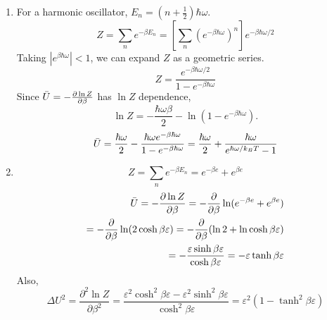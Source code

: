 \begin{enumerate}[label=(\alph*)]
            \item For a harmonic oscillator, $E_n = \left(n+\frac{1}{2}\right)\hbar\omega$.
            \begin{equation}
                Z = \sum_n e^{-\beta E_n} = \left[\sum_n (e^{-\beta\hbar\omega})^n \right] e^{-\beta\hbar\omega / 2}
            \end{equation}
            Taking $|e^{\beta\hbar\omega}|<1$, we can expand $Z$ as a geometric series.
            \begin{equation}
                Z = \frac{e^{-\beta\hbar\omega/2}}{1-e^{-\beta\hbar\omega}}
            \end{equation}
            Since $\Bar{U}=-\frac{\partial \ln Z}{\partial \beta}$ has $\ln Z$ dependence,
            \begin{equation}
                \ln Z = -\frac{\hbar\omega\beta}{2}-\ln (1-e^{-\beta\hbar\omega}).
            \end{equation}
            \begin{equation}
            \Bar{U}=\frac{\hbar\omega}{2}-\frac{\hbar\omega e^{-\beta \hbar\omega}}{1-e^{-\beta \hbar\omega}} = \frac{\hbar\omega}{2}+\frac{\hbar\omega}{e^{\hbar\omega/k_BT}-1}
            \end{equation}
            
            \item \begin{equation}
                Z=\sum_n e^{-\beta E_n}=e^{-\beta e}+e^{\beta e}
            \end{equation}
            \begin{equation}
                \begin{split}
                    \Bar{U}=-\frac{\partial \ln Z}{\partial \beta} =-\frac{\partial}{\partial \beta} \ln (e^{-\beta e}+e^{\beta e}) 
                    \\
                    =-\frac{\partial}{\partial \beta} \ln (2 \cosh \beta \varepsilon) = -\frac{\partial}{\partial \beta} (\ln 2 + \ln \cosh \beta \varepsilon)
                    \\
                    =-\frac{\varepsilon \sinh \beta \varepsilon}{\cosh \beta \varepsilon} = -\varepsilon\tanh\beta\varepsilon
                \end{split}
            \end{equation}
            Also,
            \begin{equation}
                    \Delta U^2 = \frac{\partial^2 \ln Z}{\partial \beta^2} = \frac{\varepsilon^2 \cosh^2\beta\varepsilon-\varepsilon^2\sinh^2\beta\varepsilon}{\cosh^2\beta\varepsilon} = \varepsilon^2(1-\tanh^2\beta\varepsilon)
            \end{equation}
            \end{enumerate}
